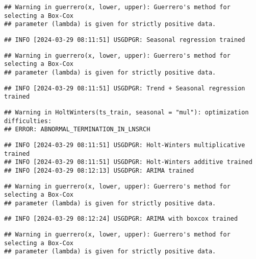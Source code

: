 \documentclass[
]{article}
\begin{document}
\begin{verbatim}
## Warning in guerrero(x, lower, upper): Guerrero's method for selecting a Box-Cox
## parameter (lambda) is given for strictly positive data.
\end{verbatim}

\begin{verbatim}
## INFO [2024-03-29 08:11:51] USGDPGR: Seasonal regression trained
\end{verbatim}

\begin{verbatim}
## Warning in guerrero(x, lower, upper): Guerrero's method for selecting a Box-Cox
## parameter (lambda) is given for strictly positive data.
\end{verbatim}

\begin{verbatim}
## INFO [2024-03-29 08:11:51] USGDPGR: Trend + Seasonal regression trained
\end{verbatim}

\begin{verbatim}
## Warning in HoltWinters(ts_train, seasonal = "mul"): optimization difficulties:
## ERROR: ABNORMAL_TERMINATION_IN_LNSRCH
\end{verbatim}

\begin{verbatim}
## INFO [2024-03-29 08:11:51] USGDPGR: Holt-Winters multiplicative trained
## INFO [2024-03-29 08:11:51] USGDPGR: Holt-Winters additive trained
## INFO [2024-03-29 08:12:13] USGDPGR: ARIMA trained
\end{verbatim}

\begin{verbatim}
## Warning in guerrero(x, lower, upper): Guerrero's method for selecting a Box-Cox
## parameter (lambda) is given for strictly positive data.
\end{verbatim}

\begin{verbatim}
## INFO [2024-03-29 08:12:24] USGDPGR: ARIMA with boxcox trained
\end{verbatim}

\begin{verbatim}
## Warning in guerrero(x, lower, upper): Guerrero's method for selecting a Box-Cox
## parameter (lambda) is given for strictly positive data.
\end{verbatim}
\end{document}
